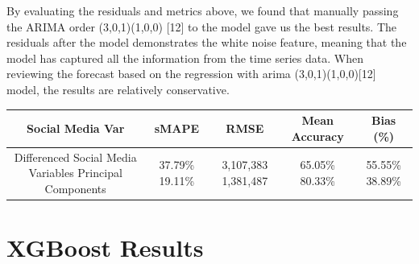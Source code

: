 \documentclass[12pt,oneside]{chicagocapstone}
\begin{document}
By evaluating the residuals and metrics above, we found that manually
passing the ARIMA order (3,0,1)(1,0,0) {[}12{]} to the model gave us the
best results. The residuals after the model demonstrates the white noise
feature, meaning that the model has captured all the information from
the time series data. When reviewing the forecast based on the
regression with arima (3,0,1)(1,0,0){[}12{]} model, the results are
relatively conservative.
\begin{longtable}[]{@{}ccccc@{}}
\toprule
\begin{minipage}[b]{0.27\columnwidth}\centering\strut
Social Media Var\strut
\end{minipage} & \begin{minipage}[b]{0.13\columnwidth}\centering\strut
sMAPE\strut
\end{minipage} & \begin{minipage}[b]{0.14\columnwidth}\centering\strut
RMSE\strut
\end{minipage} & \begin{minipage}[b]{0.16\columnwidth}\centering\strut
Mean Accuracy\strut
\end{minipage} & \begin{minipage}[b]{0.16\columnwidth}\centering\strut
Bias (\%)\strut
\end{minipage}\tabularnewline
\midrule
\endhead
\begin{minipage}[t]{0.27\columnwidth}\centering\strut
Differenced Social Media Variables Principal Components\strut
\end{minipage} & \begin{minipage}[t]{0.13\columnwidth}\centering\strut
37.79\% 19.11\%\strut
\end{minipage} & \begin{minipage}[t]{0.14\columnwidth}\centering\strut
3,107,383 1,381,487\strut
\end{minipage} & \begin{minipage}[t]{0.16\columnwidth}\centering\strut
65.05\% 80.33\%\strut
\end{minipage} & \begin{minipage}[t]{0.16\columnwidth}\centering\strut
55.55\% 38.89\%\strut
\end{minipage}\tabularnewline
\bottomrule
\end{longtable}
\section*{XGBoost Results}\label{xgboost-results}
\end{document}
